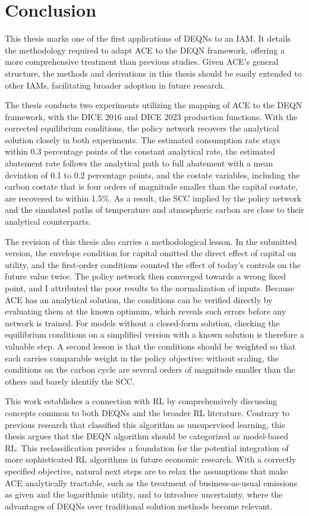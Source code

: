 \section{Conclusion}


This thesis marks one of the first applications of DEQNs to an IAM. It details the methodology required to adapt ACE to the DEQN framework, offering a more comprehensive treatment than previous studies. Given ACE's general structure, the methods and derivations in this thesis should be easily extended to other IAMs, facilitating broader adoption in future research.

The thesis conducts two experiments utilizing the mapping of ACE to the DEQN framework, with the DICE 2016 and DICE 2023 production functions. With the corrected equilibrium conditions, the policy network recovers the analytical solution closely in both experiments. The estimated consumption rate stays within 0.3 percentage points of the constant analytical rate, the estimated abatement rate follows the analytical path to full abatement with a mean deviation of 0.1 to 0.2 percentage points, and the costate variables, including the carbon costate that is four orders of magnitude smaller than the capital costate, are recovered to within 1.5\%. As a result, the SCC implied by the policy network and the simulated paths of temperature and atmospheric carbon are close to their analytical counterparts.

The revision of this thesis also carries a methodological lesson. In the submitted version, the envelope condition for capital omitted the direct effect of capital on utility, and the first-order conditions counted the effect of today's controls on the future value twice. The policy network then converged towards a wrong fixed point, and I attributed the poor results to the normalization of inputs. Because ACE has an analytical solution, the conditions can be verified directly by evaluating them at the known optimum, which reveals such errors before any network is trained. For models without a closed-form solution, checking the equilibrium conditions on a simplified version with a known solution is therefore a valuable step. A second lesson is that the conditions should be weighted so that each carries comparable weight in the policy objective: without scaling, the conditions on the carbon cycle are several orders of magnitude smaller than the others and barely identify the SCC.

This work establishes a connection with RL by comprehensively discussing concepts common to both DEQNs and the broader RL literature. Contrary to previous research that classified this algorithm as unsupervised learning, this thesis argues that the DEQN algorithm should be categorized as model-based RL. This reclassification provides a foundation for the potential integration of more sophisticated RL algorithms in future economic research. With a correctly specified objective, natural next steps are to relax the assumptions that make ACE analytically tractable, such as the treatment of business-as-usual emissions as given and the logarithmic utility, and to introduce uncertainty, where the advantages of DEQNs over traditional solution methods become relevant.
